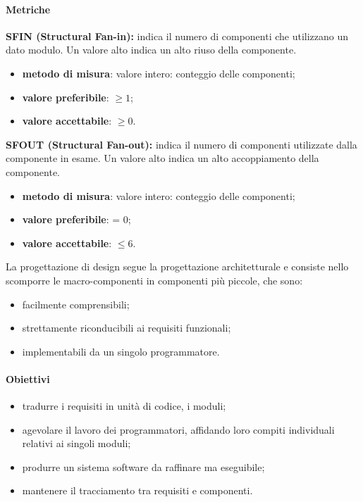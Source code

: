 \paragraph{Metriche}
\textbf{SFIN (Structural Fan-in):} indica il numero di componenti che utilizzano un dato modulo. Un valore alto indica un alto riuso della componente.
\begin{itemize}
    \item \textbf{metodo di misura}: valore intero: conteggio delle componenti;
    \item \textbf{valore preferibile}: $\geq 1$;
    \item \textbf{valore accettabile}: $\geq 0$.
\end{itemize}
\textbf{SFOUT (Structural Fan-out):} indica il numero di componenti utilizzate dalla componente in esame. Un valore alto indica un alto accoppiamento della componente.
\begin{itemize}
    \item \textbf{metodo di misura}: valore intero: conteggio delle componenti;
    \item \textbf{valore preferibile}: = 0;
    \item \textbf{valore accettabile}: $\leq 6$.
\end{itemize}
La progettazione di design segue la progettazione architetturale e consiste nello scomporre le macro-componenti in componenti 
più piccole, che sono:
\begin{itemize}
    \item facilmente comprensibili;
    \item strettamente riconducibili ai requisiti funzionali;
    \item implementabili da un singolo programmatore.
\end{itemize}
\paragraph{Obiettivi}
\begin{itemize}
    \item tradurre i requisiti in unità di codice, i moduli;
    \item agevolare il lavoro dei programmatori, affidando loro compiti individuali relativi ai singoli moduli;
    \item produrre un sistema software da raffinare ma eseguibile;
    \item mantenere il tracciamento tra requisiti e componenti.
\end{itemize}
